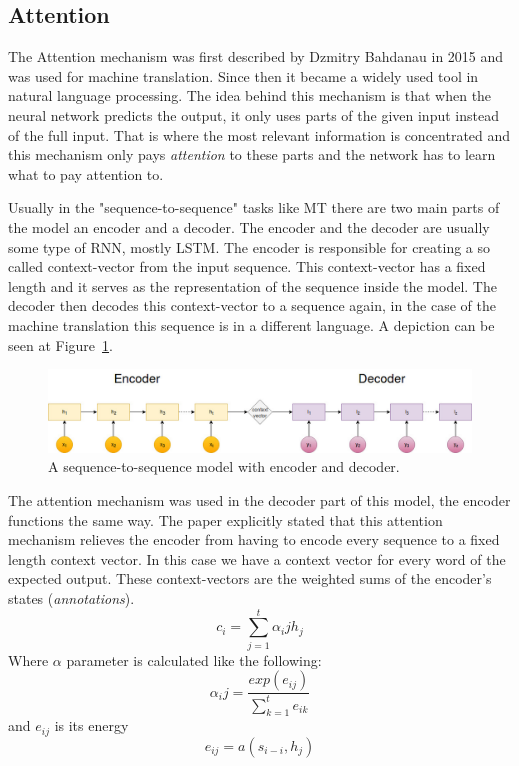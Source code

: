 \subsection{Attention}
The Attention mechanism was first described by Dzmitry Bahdanau in 2015 \cite{Bahdanau:2015} and was used for machine translation. Since then it became a widely used tool in natural language processing. The idea behind this mechanism is that when the neural network predicts the output, it only uses parts of the given input instead of the full input. That is where the most relevant information is concentrated and this mechanism only pays \textit{attention} to these parts and the network has to learn what to pay attention to.

Usually in the "sequence-to-sequence" tasks like MT there are two main parts of the model an encoder and a decoder. The encoder and the decoder are usually some type of RNN, mostly LSTM. The encoder is responsible for creating a so called context-vector from the input sequence. This context-vector has a fixed length and it serves as the representation of the sequence inside the model. The decoder then decodes this context-vector to a sequence again, in the case of the machine translation this sequence is in a different language. A depiction can be seen at Figure~\ref{fig:seq_to_seq}.
\begin{figure}[!ht]
	\centering
	\includegraphics[width=150mm, keepaspectratio]{figures/seq_to_seq.jpg}
	\caption{A sequence-to-sequence model with encoder and decoder.}
	\label{fig:seq_to_seq}
\end{figure}

The attention mechanism was used in the decoder part of this model, the encoder functions the same way. The paper explicitly stated that this attention mechanism relieves the encoder from having to encode every sequence to a fixed length context vector. In this case we have a context vector for every word of the expected output. These context-vectors are the weighted sums of the encoder's states (\textit{annotations}).
\[c_i = \sum_{j=1}^{t} \alpha_ij h_j\]
Where \(\alpha\) parameter is calculated like the following:
\[\alpha_ij = \frac{exp(e_{ij})}{\sum_{k=1}^{t} e_{ik}} \]
and \(e_{ij}\) is its energy
\[e_{ij} = a(s_{i-i}, h_j)\]

